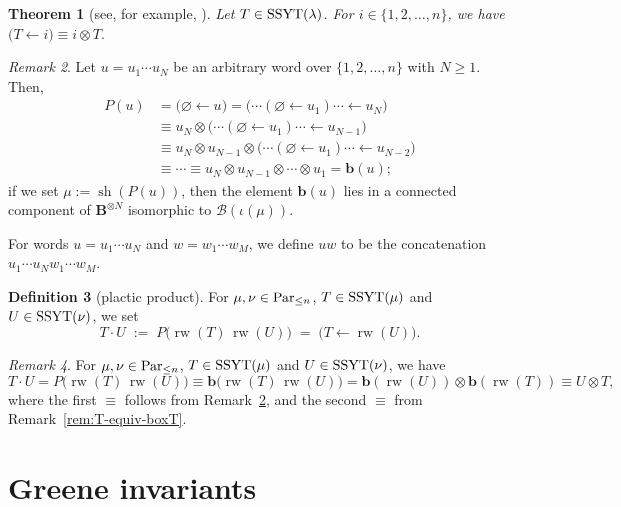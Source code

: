 \documentclass[reqno]{amsart}
\newtheorem{theorem}{Theorem}[section]
\theoremstyle{definition}
\newtheorem{definition}[theorem]{Definition}
\theoremstyle{remark}
\newtheorem{remark}[theorem]{Remark}
\numberwithin{equation}{section}
\newcommand{\B}{\mathcal{B}}
\newcommand{\shape}{\operatorname{sh}}
\newcommand{\rw}{\operatorname{rw}}
\begin{document}
	\begin{theorem}[{see, for example, \cite[\S 8.3]{bumpschilling}}]\label{thm:plactic-theory}
		Let $T\in\operatorname{SSYT}(\lambda)$.
		For $i\in\{1,2,\dots,n\}$,
		we have $\bigl(T\leftarrow i\bigr)\equiv \boxed{i}\otimes T.$
	\end{theorem}
	\begin{remark}\label{rem:word-component}
		Let $u=u_1\cdots u_N$ be an arbitrary word over $\{1,2,\dots,n\}$ with $N\ge1$.
		Then,
		\begin{align*}
		P(u)&=\bigl(\varnothing\leftarrow u\bigr)
		=\bigl(\cdots(\varnothing\leftarrow u_1)\cdots\leftarrow u_N\bigr)\\
		&\equiv \boxed{u_N}\otimes \bigl(\cdots(\varnothing\leftarrow u_1)\cdots\leftarrow u_{N-1}\bigr)\\
		&\equiv \boxed{u_N}\otimes \boxed{u_{N-1}}\otimes \bigl(\cdots(\varnothing\leftarrow u_1)\cdots\leftarrow u_{N-2}\bigr)\\
		&\equiv \cdots \equiv \boxed{u_N}\otimes \boxed{u_{N-1}}\otimes \cdots\otimes \boxed{u_1}=\mathbf{b}(u);
		\end{align*} 
		if we set $\mu:=\shape(P(u))$,
		then the element $\mathbf{b}(u)$ lies in a connected component of $\mathbf{B}^{\otimes N}$
		isomorphic to $\B(\iota(\mu))$.
	\end{remark}
	
	   For words $u=u_1\cdots u_N$ and $w=w_1\cdots w_M$,
	   we define $uw$ to be the concatenation $u_1\cdots u_N w_1\cdots w_M$.
	
	\begin{definition}[plactic product]\label{def:plactic-product}
		For $\mu,\nu\in\mathrm{Par}_{\le n}$, $T\in\operatorname{SSYT}(\mu)$ and $U\in\operatorname{SSYT}(\nu)$,
		we set
		\[
		T\cdot U \;:=\; P\bigl(\rw(T)\,\rw(U)\bigr) \;=\; \bigl(T\leftarrow \rw(U)\bigr).
		\]
	\end{definition}
	
	\begin{remark}\label{rem:plactic-tensor}
		For $\mu,\nu\in\mathrm{Par}_{\le n}$, $T\in\operatorname{SSYT}(\mu)$ and $U\in\operatorname{SSYT}(\nu)$, we have
		\[
		T\cdot U=P\bigl(\rw(T)\,\rw(U)\bigr)\equiv\mathbf{b}\bigl(\rw(T)\,\rw(U)\bigr)
		=\mathbf{b}(\rw(U))\otimes\mathbf{b}(\rw(T))\equiv U\otimes T,
		\]
		where the first $\equiv$ follows from Remark~\ref{rem:word-component},
		and the second $\equiv$ from Remark~\ref{rem:T-equiv-boxT}.
	\end{remark}
	
	\section{Greene invariants}\label{sec:greene}
	
\end{document}
